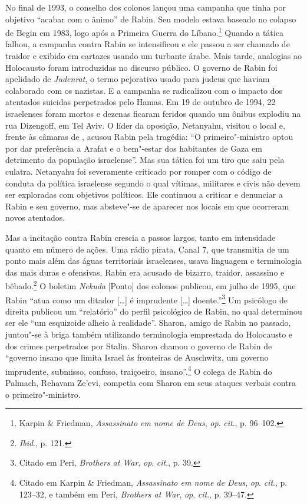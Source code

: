 No final de 1993, o conselho dos colonos lançou uma campanha que tinha por objetivo
``acabar com o ânimo'' de Rabin. Seu modelo estava baseado no colapso de
Begin em 1983, logo após a Primeira Guerra do Líbano.\footnote{Karpin \& Friedman, \emph{Assassinato em nome de Deus},
\emph{op}. \emph{cit}., p. 96--102.} Quando
a tática falhou, a campanha contra Rabin se intensificou e ele passou a
ser chamado de traidor e exibido em cartazes usando um turbante árabe.
Mais tarde, analogias ao Holocausto foram introduzidas no discurso
público. O governo de Rabin foi apelidado de \emph{Judenrat}, o termo
pejorativo usado para judeus que haviam colaborado com os nazistas. E a
campanha se radicalizou com o impacto dos atentados suicidas perpetrados
pelo Hamas. Em 19 de outubro de 1994, 22 israelenses foram
mortos e dezenas ficaram feridos quando um ônibus explodiu na rua Dizengoff, em
Tel Aviv. O líder da oposição, Netanyahu, visitou o local e, frente às
câmaras de , acusou Rabin pela tragédia: ``O primeiro"-ministro optou
por dar preferência a Arafat e o bem"-estar dos habitantes de Gaza em
detrimento da população israelense''. Mas sua tática foi um tiro que
saiu pela culatra. Netanyahu foi severamente criticado por romper com o
código de conduta da política israelense segundo o qual vítimas,
militares e civis não devem ser exploradas com objetivos políticos. Ele
continuou a criticar e denunciar a Rabin e seu governo, mas absteve"-se
de aparecer nos locais em que ocorreram novos atentados.

Mas a incitação contra Rabin crescia a passos largos, tanto em
intensidade quanto em número de ações. Uma rádio pirata, Canal 7, que
transmitia de um ponto mais além das águas territoriais israelenses,
usava linguagem e terminologia das mais duras e ofensivas. Rabin era
acusado de bizarro, traidor, assassino e bêbado.\footnote{\emph{Ibid}., p. 121.} O
boletim \emph{Nekuda} {[}Ponto{]} dos colonos publicou, em julho de 1995, que Rabin
``atua como um ditador {[}\ldots{}{]} é imprudente {[}\ldots{}{]} doente.''\footnote{Citado em Peri, \emph{Brothers at War}, \emph{op}. \emph{cit}., p. 39.} Um
psicólogo de direita publicou um ``relatório'' do perfil psicológico de
Rabin, no qual determinou ser ele ``um esquizoide alheio à realidade''.
Sharon, amigo de Rabin no passado, juntou"-se à briga também utilizando
terminologia emprestada do Holocausto e dos crimes perpetrados por
Stalin. Sharon chamou o governo de Rabin de ``governo insano que limita
Israel às fronteiras de Auschwitz, um governo imprudente, submisso,
confuso, traiçoeiro, insano''.\footnote{Citado em Karpin \& Friedman, \emph{Assassinato em nome de Deus}, \emph{op}. \emph{cit}., p. 123--32, e também em Peri, 
\emph{Brothers at War}, \emph{op}. \emph{cit}., p. 39--47.} O colega de Rabin do Palmach, Rehavam Ze'evi, competia com Sharon em seus ataques verbais contra o
primeiro"-ministro.

